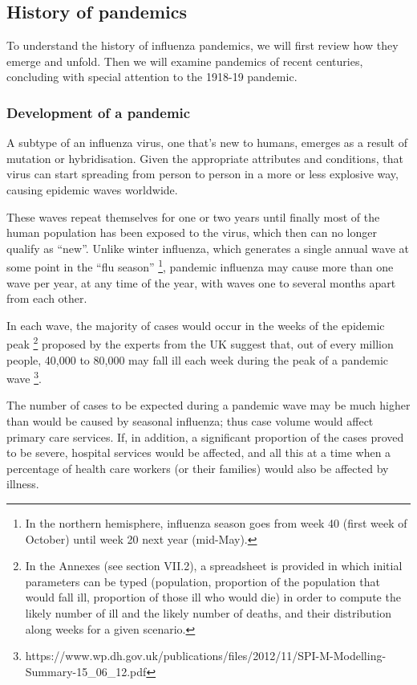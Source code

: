 \documentclass[12pt, a4]{scrartcl}
\begin{document}
\subsection{History of pandemics}
To understand the history of influenza pandemics, we will first review how they emerge and unfold. Then we will examine pandemics of recent centuries, concluding with special attention to the 1918-19 pandemic.

\subsubsection {Development of a pandemic}
A subtype of an influenza virus, one that’s new to humans, emerges as a result of mutation or hybridisation. Given the appropriate attributes and conditions, that virus can start spreading from person to person in a more or less explosive way, causing epidemic waves worldwide.

These waves repeat themselves for one or two years until finally most of the human population has been exposed to the virus, which then can no longer qualify as “new”. Unlike winter influenza, which generates a single annual wave at some point in the “flu season” \footnote{In the northern hemisphere, influenza season goes from week 40 (first week of October) until week 20 next year (mid-May).}, pandemic influenza may cause more than one wave per year, at any time of the year, with waves one to several months apart from each other.

In each wave, the majority of cases would occur in the weeks of the epidemic peak \footnote{In the Annexes (see section VII.2), a spreadsheet is provided in which initial parameters can be typed (population, proportion of the population that would fall ill, proportion of those ill who would die) in order to compute the likely number of ill and the likely number of deaths, and their distribution along weeks for a given scenario.} proposed by the experts from the UK suggest that, out of every million people, 40,000 to 80,000 may fall ill each week during the peak of a pandemic wave \footnote{https://www.wp.dh.gov.uk/publications/files/2012/11/SPI-M-Modelling-Summary-15_06_12.pdf}.

The number of cases to be expected during a pandemic wave may be much higher than would be caused by seasonal influenza; thus case volume would affect primary care services. If, in addition, a significant proportion of the cases proved to be severe, hospital services would be affected, and all this at a time when a percentage of health care workers (or their families) would also be affected by illness. 
\end{document}
